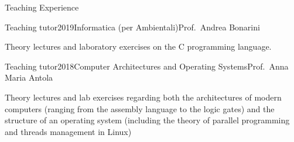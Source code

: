 \documentclass{resume} %
\newif\ifpublic{}
\begin{document}
\begin{rSection}{Teaching Experience}

\begin{rSubsection}{Teaching tutor}{2019}{Informatica (per Ambientali)}{Prof.\ Andrea Bonarini}
\item Theory lectures and laboratory exercises on the C programming language.
\end{rSubsection}

\begin{rSubsection}{Teaching tutor}{2018}{Computer Architectures and Operating Systems}{Prof.\ Anna Maria Antola}
\item Theory lectures and lab exercises regarding both the architectures of
  modern computers (ranging from the assembly language to the logic gates) and
  the structure of an operating system (including the theory of parallel
  programming and threads management in Linux)
\end{rSubsection}
\end{rSection}
\vfill
\ifpublic{%
    
    
  }
\fi
\end{document}
